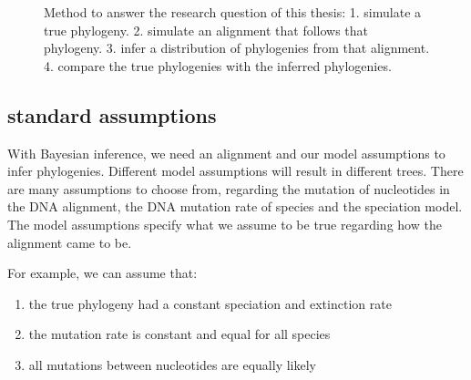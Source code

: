 \begin{figure}[H]
{
  }
  \caption{
    Method to answer the research question of this thesis:
    1. simulate a true phylogeny. 
    2. simulate an alignment that follows that phylogeny. 
    3. infer a distribution of phylogenies from that alignment.
    4. compare the true phylogenies with the inferred phylogenies.
  }
  \label{fig:research_workflow}
\end{figure}

\subsection{standard assumptions}

With Bayesian inference, we need an alignment and our model assumptions to
infer phylogenies.
Different model assumptions will result in different trees.
There are many assumptions to choose from, regarding
the mutation of nucleotides in the DNA alignment, the
DNA mutation rate of species and the speciation model.
The model assumptions specify what we assume to be true regarding how
the alignment came to be. 

For example, we can assume that:

\begin{enumerate}[label=\arabic*)]\itemsep2pt
  \item the true phylogeny had a constant speciation and extinction rate 
  \item the mutation rate is constant and equal for all species
  \item all mutations between nucleotides are equally likely
\end{enumerate}


